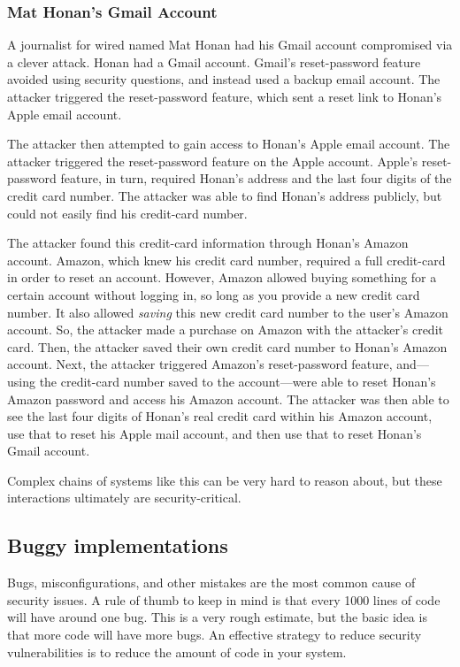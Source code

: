 \subsubsection{Mat Honan's Gmail Account}
A journalist for wired named Mat Honan had his Gmail account compromised via a clever attack.\autocite{honan}
Honan had a Gmail account.
Gmail's reset-password feature avoided using security questions, and instead used a backup email account.
The attacker triggered the reset-password feature, which sent a reset link
to Honan's Apple email account.

The attacker then attempted to gain access to Honan's Apple email account.
The attacker triggered the reset-password feature on the Apple account.
Apple's reset-password feature, in turn, required Honan's address and the last four digits of the credit card number.
The attacker was able to find Honan's address publicly, but could not easily find his credit-card number.

The attacker found this credit-card information through Honan's Amazon account.
Amazon, which knew his credit card number, required a full credit-card in order to reset an account.
However, Amazon allowed buying something for a certain account without logging in, 
so long as you provide a new credit card number.
It also allowed \textit{saving} this new credit card number to the user's Amazon account.
So, the attacker made a purchase on Amazon with the attacker's credit card.
Then, the attacker saved their own credit card number to Honan's Amazon account.
Next, the attacker triggered Amazon's reset-password feature, and---using the credit-card
number saved to the account---were able to reset Honan's 
Amazon password and access his Amazon account.
The attacker was then able to see the last four
digits of Honan's real credit card within his
Amazon account, use that to reset his Apple mail
account, and then use that to reset Honan's Gmail
account.

Complex chains of systems like this can be very hard to reason about,
but these interactions ultimately are security-critical.

\subsection{Buggy implementations}
Bugs, misconfigurations, and other mistakes are
the most common cause of security issues. A rule
of thumb to keep in mind is that every 1000 lines
of code will have around one bug. This is a very
rough estimate, but the basic idea is that more
code will have more bugs. An effective strategy to
reduce security vulnerabilities is to reduce the
amount of code in your system.

